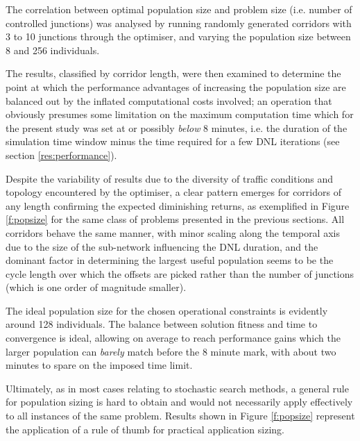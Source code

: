 The correlation between optimal population size and problem size (i.e. number of controlled junctions) was analysed by running randomly generated corridors with 3 to 10 junctions through the optimiser, and varying the population size between 8 and 256 individuals. 
 
The results, classified by corridor length, were then examined to determine the point at which the performance advantages of increasing the population size are balanced out by the inflated computational costs involved; an operation that obviously presumes some limitation on the maximum computation time which for the present study was set at or possibly \emph{below} 8 minutes, i.e. the duration of the simulation time window minus the time required for a few DNL iterations (see section \ref{res:performance}).

Despite the variability of results due to the diversity of traffic conditions and topology encountered by the optimiser, a clear pattern emerges for corridors of any length confirming the expected diminishing returns, as exemplified in Figure \ref{f:popsize} for the same class of problems presented in the previous sections.
All corridors behave the same manner, with minor scaling along the temporal axis due to the size of the sub-network influencing the DNL duration, and the dominant factor in determining the largest useful population seems to be the cycle length over which the offsets are picked rather than the number of junctions (which is one order of magnitude smaller).


The ideal population size for the chosen operational constraints is evidently around 128 individuals. The balance between solution fitness and time to convergence is ideal, allowing on average to reach performance gains which the larger population can \emph{barely} match before the 8 minute mark, with about two minutes to spare on the imposed time limit.

Ultimately, as in most cases relating to stochastic search methods, a general rule for population sizing is hard to obtain and would not necessarily apply effectively to all instances of the same problem. Results shown in Figure \ref{f:popsize} represent the application of a rule of thumb for practical application sizing.


